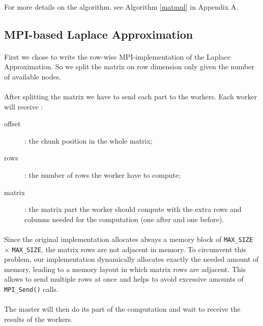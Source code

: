 \documentclass[]{article}
\begin{document}
\paragraph{} For more details on the algorithm, see Algorithm \ref{matmul} in Appendix A.

\subsection{MPI-based Laplace Approximation}

\paragraph{} First we chose to write the row-wise MPI-implementation of the Laplace Approximation. So we split the matrix on row dimension only given the number of available nodes.
\paragraph{} After splitting the matrix we have to send each part to the workers. Each worker will receive : 
\begin{description}
	\item[offset]: the chunk position in the whole matrix; 
	\item[rows]: the number of rows the worker have to compute;
	\item[matrix]: the matrix part the worker should compute with the extra rows and columns needed for the computation (one after and one before). 
\end{description}

\paragraph{} Since the original implementation allocates always a memory block of \texttt{MAX\_SIZE} $\times$ \texttt{MAX\_SIZE}, the matrix rows are not adjacent in memory. To circumvent this problem, our implementation dynamically allocates exactly the needed amount of memory, leading to a memory layout in which matrix rows are adjacent. This allows to send multiple rows at once and helps to avoid excessive amounts of \texttt{MPI\_Send()} calls.

\paragraph{} The master will then do its part of the computation and wait to receive the results of the workers. 
\end{document}
